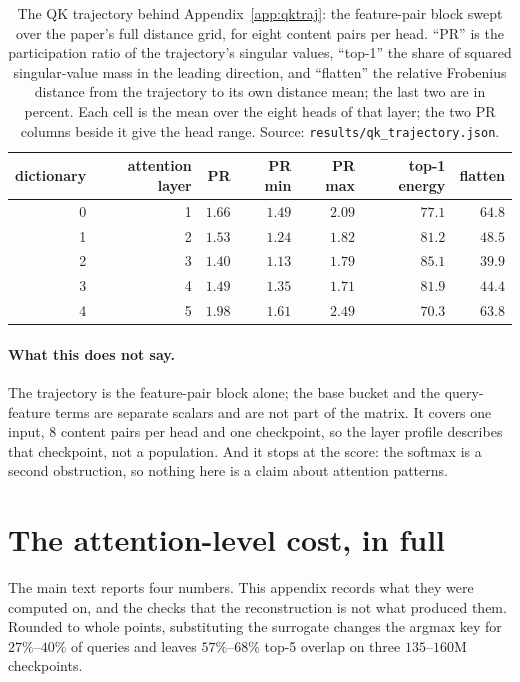 \documentclass{article}
\theoremstyle{plain}
\theoremstyle{remark}
\begin{document}
\begin{table}[t]
  \centering
  \caption{The QK trajectory behind Appendix~\ref{app:qktraj}: the feature-pair
    block swept over the paper's full distance grid, for eight content pairs per
    head. ``PR'' is the participation ratio of the trajectory's singular values,
    ``top-1'' the share of squared singular-value mass in the leading direction,
    and ``flatten'' the relative Frobenius distance from the trajectory to its
    own distance mean; the last two are in percent. Each cell is the mean over
    the eight heads of that layer; the two PR columns beside it give the head
    range. Source: \texttt{results/qk\_trajectory.json}.}
  \label{tab:qk-trajectory}
  \begin{tabular}{rrrrrrr}
    \toprule
    dictionary & attention layer & PR & PR min & PR max & top-1 energy & flatten \\
    \midrule
    0 & 1 & $1.66$ & $1.49$ & $2.09$ & $77.1$ & $64.8$ \\
    1 & 2 & $1.53$ & $1.24$ & $1.82$ & $81.2$ & $48.5$ \\
    2 & 3 & $1.40$ & $1.13$ & $1.79$ & $85.1$ & $39.9$ \\
    3 & 4 & $1.49$ & $1.35$ & $1.71$ & $81.9$ & $44.4$ \\
    4 & 5 & $1.98$ & $1.61$ & $2.49$ & $70.3$ & $63.8$ \\
    \bottomrule
  \end{tabular}
\end{table}

\paragraph{What this does not say.} The trajectory is the feature-pair block
alone; the base bucket and the query-feature terms are separate scalars and are
not part of the matrix. It covers one input, $8$ content pairs per head and
one checkpoint, so the layer profile describes that checkpoint, not a
population. And it stops at the score: the softmax is a second obstruction, so
nothing here is a claim about attention patterns.

\section{The attention-level cost, in full}
\label{app:attention}

The main text reports four numbers. This appendix records what they were computed
on, and the checks that the reconstruction is not what produced them. Rounded to
whole points, substituting the surrogate changes the argmax key for
$27\%$--$40\%$ of queries and leaves $57\%$--$68\%$ top-5 overlap on three
$135$--$160$M checkpoints.
\end{document}
